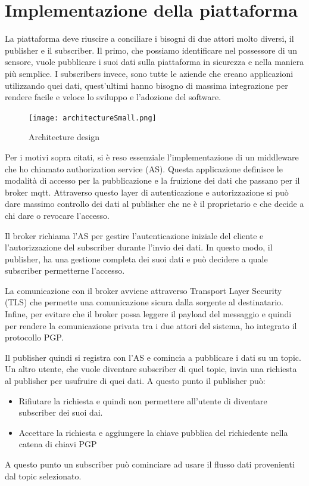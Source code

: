 \chapter{Implementazione della piattaforma}

La piattaforma deve riuscire a conciliare i bisogni di due attori molto diversi, il publisher e il subscriber.
Il primo, che possiamo identificare nel possessore di un sensore, vuole pubblicare i suoi dati sulla piattaforma in sicurezza e nella maniera più semplice. I subscribers invece, sono tutte le aziende che creano applicazioni utilizzando quei dati, quest'ultimi hanno bisogno di massima integrazione per rendere facile e veloce lo sviluppo e l'adozione del software.
\begin{figure}
\begin{center}
 \texttt{[image: architectureSmall.png]}%
 \caption{Architecture design}
 \label{fig:architecture}
\end{center}
\end{figure}

Per i motivi sopra citati, si è reso essenziale l'implementazione di un middleware che ho chiamato authorization service (AS). Questa applicazione definisce le modalità di accesso per la pubblicazione e la fruizione dei dati che passano per il broker mqtt. Attraverso questo layer di autenticazione e autorizzazione si può dare massimo controllo dei dati al publisher che ne è il proprietario e che decide a chi dare o revocare l'accesso.

Il broker richiama l'AS per gestire l'autenticazione iniziale del cliente e l'autorizzazione del subscriber durante l'invio dei dati. In questo modo, il publisher, ha una gestione completa dei suoi dati e può decidere a quale subscriber permetterne l'accesso.

La comunicazione con il broker avviene attraverso Transport Layer Security (TLS) che permette una comunicazione sicura dalla sorgente al destinatario. Infine, per evitare che il broker possa leggere il payload del messaggio e quindi per rendere la comunicazione privata tra i due attori del sistema, ho integrato il protocollo PGP.

Il publisher quindi si registra con l'AS e comincia a pubblicare i dati su un topic. Un altro utente, che vuole diventare subscriber di quel topic, invia una richiesta al publisher per usufruire di quei dati. A questo punto il publisher può:
\begin{itemize}
    \item Rifiutare la richiesta e quindi non permettere all'utente di diventare subscriber dei suoi dai.
    \item Accettare la richiesta e aggiungere la chiave pubblica del richiedente nella catena di chiavi PGP
\end{itemize}
A questo punto un subscriber può cominciare ad usare il flusso dati provenienti dal topic selezionato.

